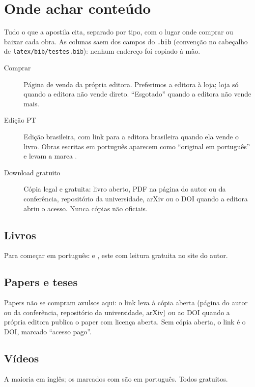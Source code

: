 \chapter{Onde achar conteúdo}
\label{ap:onde-achar}

Tudo o que a apostila cita, separado por tipo, com o lugar onde comprar ou
baixar cada obra. As colunas saem dos campos do \texttt{.bib} (convenção no
cabeçalho de \texttt{latex/bib/testes.bib}): nenhum endereço foi copiado à mão.

\begin{description}
\item[Comprar] Página de venda da própria editora. Preferimos a editora à
  loja; loja só quando a editora não vende direto. \enquote{Esgotado} quando
  a editora não vende mais.
\item[Edição PT] Edição brasileira, com link para a editora brasileira quando
  ela vende o livro. Obras escritas em português aparecem como
  \enquote{original em português} e levam a marca \pt.
\item[Download gratuito] Cópia legal e gratuita: livro aberto, PDF na página
  do autor ou da conferência, repositório da universidade, arXiv ou o DOI
  quando a editora abriu o acesso. Nunca cópias não oficiais.
\end{description}

\nocite{livro:valente2020}
\nocite{curso:dev-java-learn}
\nocite{comunidade:soujava,comunidade:soujava-github,comunidade:guj}

\section{Livros}
Para começar em português:  \pt e
 \pt, este com leitura gratuita no site do
autor.


\section{Papers e teses}
Papers não se compram avulsos aqui: o link leva à cópia aberta (página do
autor ou da conferência, repositório da universidade, arXiv) ou ao DOI
quando a própria editora publica o paper com licença aberta. Sem cópia
aberta, o link é o DOI, marcado \enquote{acesso pago}.


\section{Vídeos}
A maioria em inglês; os marcados com \pt são em português. Todos gratuitos.


